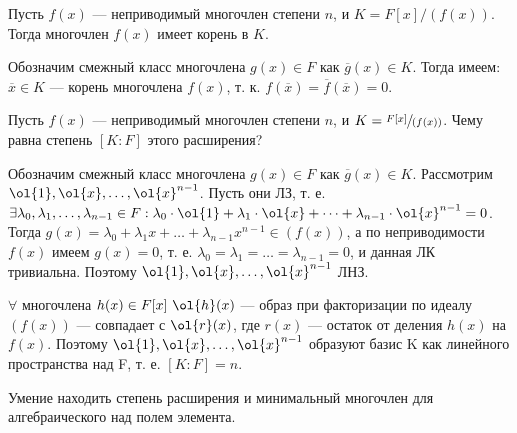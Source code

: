 \begin{problem}
Пусть $f(x)$ --- неприводимый многочлен степени $n$, и $K = F[x]/(f(x))$. Тогда многочлен $f(x)$ имеет корень в $K$.
\end{problem}

\begin{solution}
Обозначим смежный класс многочлена \(g(x) \in F\) как \(\overline{g}(x) \in K\). Тогда имеем: \(\overline{x} \in K\) --- корень многочлена \(f(x)\), т. к. \(f(\overline{x}) = \overline{f}(\overline{x}) = 0\).
\end{solution}

\begin{problem}
Пусть $f(x)$ --- неприводимый многочлен степени $n$, и $K = \sfrac{F[x]}{(f(x))}$. Чему равна степень $[K : F]$ этого расширения?
\end{problem}

\begin{solution}
Обозначим смежный класс многочлена \(g(x) \in F\) как \(\overline{g}(x) \in K\). Рассмотрим \(\ol{1}, \ol{x}, \dots, \ol{x}^{n-1}\). Пусть они ЛЗ, т. е. \(\exists \lambda_0, \lambda_1, \dots, \lambda_{n-1} \in F: \lambda_0\cdot\ol{1}+\lambda_1\cdot\ol{x}+\dots+\lambda_{n-1}\cdot\ol{x}^{n-1} = 0\). Тогда \(g(x) = \lambda_0+\lambda_1x+\dots+\lambda_{n-1}x^{n-1} \in (f(x))\), а по неприводимости \(f(x)\) имеем \(g(x) = 0\), т. е. \(\lambda_0 = \lambda_1 = \dots = \lambda_{n-1} = 0\), и данная ЛК тривиальна. Поэтому \(\ol{1}, \ol{x}, \dots, \ol{x}^{n-1}\) ЛНЗ.

\(\forall\) многочлена \(h(x) \in F[x] \ \ol{h}(x)\) --- образ при факторизации по идеалу \((f(x))\) --- совпадает с \(\ol{r}(x)\), где \(r(x)\) --- остаток от деления \(h(x)\) на \(f(x)\). Поэтому \(\ol{1}, \ol{x}, \dots, \ol{x}^{n-1}\) образуют базис K как линейного пространства над F, т. е. \([K:F] = n\).
\end{solution}

\begin{problem}[34 (7.9,7.10)] Умение находить степень расширения и минимальный многочлен для алгебраического над полем элемента.
\end{problem}

